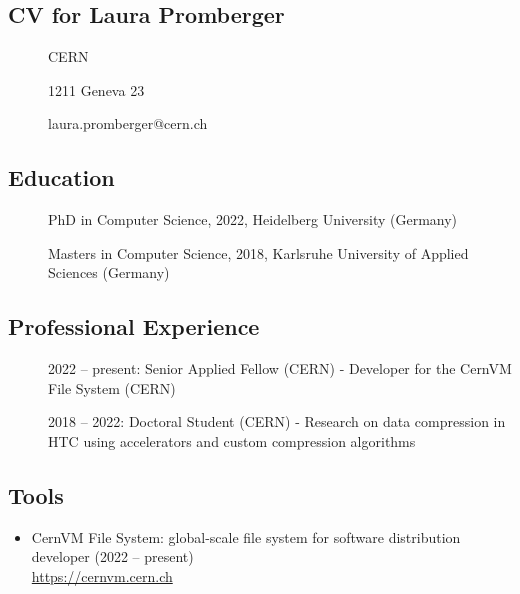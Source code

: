 
\subsection{CV for Laura Promberger}
\begin{description}
    \item[] CERN
    \item[] 1211 Geneva 23
    \item[] laura.promberger@cern.ch
\end{description}

\subsection*{Education}
\begin{description}
    \item[] PhD in Computer Science, 2022, Heidelberg University (Germany)
    \item[] Masters in Computer Science, 2018, Karlsruhe University of Applied Sciences (Germany)
\end{description}

\subsection*{Professional Experience}
\begin{description}
    \item[] 2022 -- present: Senior Applied Fellow (CERN) - Developer for the CernVM File System (CERN)
    \item[] 2018 -- 2022: Doctoral Student (CERN) - Research on data compression in HTC using accelerators and custom compression algorithms
\end{description}

\subsection*{Tools}

\begin{itemize}
    \item[] CernVM File System: global-scale file system for software distribution
    \\developer (2022 -- present)
    \\{\small{\url{https://cernvm.cern.ch}}}
\end{itemize}

